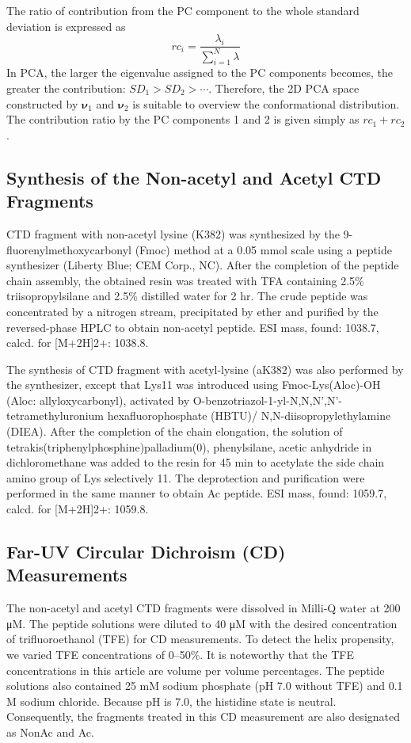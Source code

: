 The ratio of contribution from the PC component  to the whole standard deviation is expressed as
\begin{equation}
\label{eq:rc}
rc_i = \frac{\lambda_i}{\sum_{i=1}^N \lambda}
\end{equation}
In PCA, the larger the eigenvalue assigned to the PC components  becomes, the greater the contribution: $SD_1>SD_2>\cdots$. Therefore, the 2D PCA space constructed by $\bm{\nu}_1$ and $\bm{\nu}_2$ is suitable to overview the conformational distribution. The contribution ratio by the PC components 1 and 2 is given simply as $rc_1+rc_2$.

\subsection{Synthesis of the Non-acetyl and Acetyl CTD Fragments}
CTD fragment with non-acetyl lysine (K382) was synthesized by the 9-fluorenylmethoxycarbonyl (Fmoc) method at a 0.05 mmol scale using a peptide synthesizer (Liberty Blue; CEM Corp., NC). After the completion of the peptide chain assembly, the obtained resin was treated with TFA containing 2.5\% triisopropylsilane and 2.5\% distilled water for 2 hr. The crude peptide was concentrated by a nitrogen stream, precipitated by ether and purified by the reversed-phase HPLC to obtain non-acetyl peptide. ESI mass, found: 1038.7, calcd. for [M+2H]2+: 1038.8.
	
	The synthesis of CTD fragment with acetyl-lysine (aK382) was also performed by the synthesizer, except that Lys11 was introduced using Fmoc-Lys(Aloc)-OH (Aloc: allyloxycarbonyl), activated by O-benzotriazol-1-yl-N,N,N’,N’-tetramethyluronium hexafluorophosphate (HBTU)/ N,N-diisopropylethylamine (DIEA). After the completion of the chain elongation, the solution of tetrakis(triphenylphosphine)palladium(0), phenylsilane, acetic anhydride in dichloromethane was added to the resin for 45 min to acetylate the side chain amino group of Lys selectively 11. The deprotection and purification were performed in the same manner to obtain Ac peptide. ESI mass, found: 1059.7, calcd. for [M+2H]2+: 1059.8.
	
\subsection{Far-UV Circular Dichroism (CD) Measurements}
The non-acetyl and acetyl CTD fragments were dissolved in Milli-Q water at 200 μM. The peptide solutions were diluted to 40 μM with the desired concentration of trifluoroethanol (TFE) for CD measurements. To detect the helix propensity, we varied TFE concentrations of 0–50\%. It is noteworthy that the TFE concentrations in this article are volume per volume percentages. The peptide solutions also contained 25 mM sodium phosphate (pH 7.0 without TFE) and 0.1 M sodium chloride. Because pH is 7.0, the histidine state is neutral. Consequently, the fragments treated in this CD measurement are also designated as NonAc and Ac.

